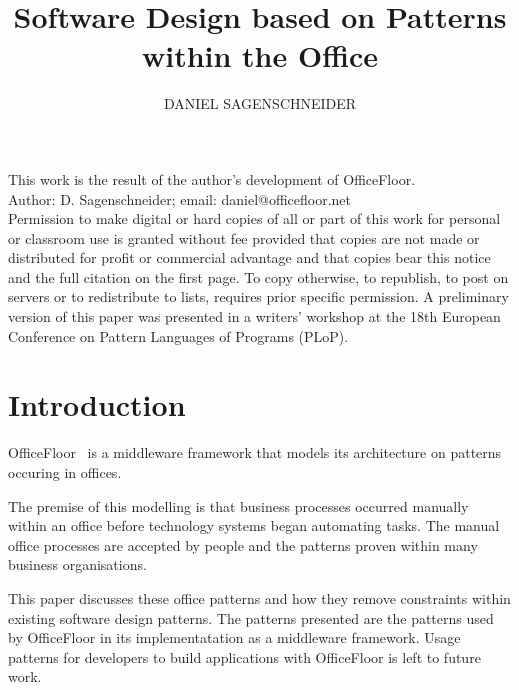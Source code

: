 \documentclass[prodmode]{style/acmlarge}
\title{Software Design based on Patterns within the Office}
\author{DANIEL SAGENSCHNEIDER \affil{OfficeFloor, daniel@officefloor.net}}
\begin{document}
\graphicspath{{./pdf/}}

\lstset{language=Java}

\captionsetup[lstlisting]{font=footnotesize}


\begin{bottomstuff}
This work is the result of the author's development of OfficeFloor.\\
Author: D. Sagenschneider; email: daniel@officefloor.net\\

Permission to make digital or hard copies of all or part of this work for
personal or classroom use is granted without fee provided that copies are not
made or distributed for profit or commercial advantage and that copies bear this
notice and the full citation on the first page. To copy otherwise, to republish,
to post on servers or to redistribute to lists, requires prior specific
permission. A preliminary version of this paper was presented in a writers'
workshop at the 18th European Conference on Pattern Languages of Programs
(PLoP).
\end{bottomstuff}

\maketitle




\section{Introduction}

OfficeFloor~\cite{officefloor} is a middleware framework that models its
architecture on patterns occuring in offices.

The premise of this modelling is that business processes occurred manually
within an office before technology systems began automating tasks.  The manual
office processes are accepted by people and the patterns proven within many
business organisations.

This paper discusses these office patterns and how they remove constraints
within existing software design patterns.  The patterns presented are the
patterns used by OfficeFloor in its implementatation as a middleware framework.
Usage patterns for developers to build applications with OfficeFloor is left to
future work.
\end{document}
